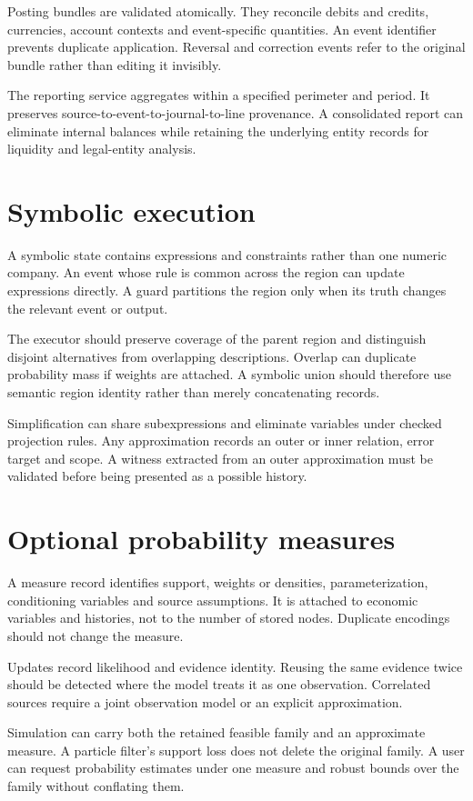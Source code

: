 Posting bundles are validated atomically. They reconcile debits and credits, currencies, account contexts and event-specific quantities. An event identifier prevents duplicate application. Reversal and correction events refer to the original bundle rather than editing it invisibly.

The reporting service aggregates within a specified perimeter and period. It preserves source-to-event-to-journal-to-line provenance. A consolidated report can eliminate internal balances while retaining the underlying entity records for liquidity and legal-entity analysis.

\section{Symbolic execution}
A symbolic state contains expressions and constraints rather than one numeric company. An event whose rule is common across the region can update expressions directly. A guard partitions the region only when its truth changes the relevant event or output.

The executor should preserve coverage of the parent region and distinguish disjoint alternatives from overlapping descriptions. Overlap can duplicate probability mass if weights are attached. A symbolic union should therefore use semantic region identity rather than merely concatenating records.

Simplification can share subexpressions and eliminate variables under checked projection rules. Any approximation records an outer or inner relation, error target and scope. A witness extracted from an outer approximation must be validated before being presented as a possible history.

\section{Optional probability measures}
A measure record identifies support, weights or densities, parameterization, conditioning variables and source assumptions. It is attached to economic variables and histories, not to the number of stored nodes. Duplicate encodings should not change the measure.

Updates record likelihood and evidence identity. Reusing the same evidence twice should be detected where the model treats it as one observation. Correlated sources require a joint observation model or an explicit approximation.

Simulation can carry both the retained feasible family and an approximate measure. A particle filter's support loss does not delete the original family. A user can request probability estimates under one measure and robust bounds over the family without conflating them.

